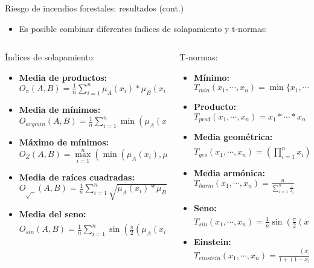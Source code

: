 \documentclass{beamer}
\begin{document}
\begin{frame}{Riesgo de incendios forestales: resultados (cont.)}
\begin{itemize}
\item Es posible combinar diferentes índices de solapamiento y t-normas:
\end{itemize}
\begin{columns}[T] %
\begin{column}{.48\textwidth}
Índices de solapamiento:
\footnotesize
\begin{itemize}
	\item \bfseries Media de productos: \\ $O_{\pi}(A,B) = \frac{1}{n}\sum_{i=1}^{n}\mu_A(x_i)*\mu_B(x_i)$
	\item \bfseries Media de mínimos: \\ $O_{avgmin}(A,B) = \frac{1}{n}\sum_{i=1}^{n}\min(\mu_A(x_i),\mu_B(x_i))$
	\item \bfseries Máximo de mínimos: \\ $O_{Z}(A,B) = \max\limits_{i=1}^{n}(\min(\mu_A(x_i),\mu_B(x_i)))$
	\item \bfseries Media de raíces cuadradas: \\ $O_{\sqrt{\text{ }}}(A,B) =  \frac{1}{n}\sum_{i=1}^{n}\sqrt{\mu_A(x_i)*\mu_B(x_i)}$
	\item \bfseries Media del seno:  \\ $O_{sin}(A, B) = \frac{1}{n}\sum_{i=1}^{n}\sin(\frac{\pi}{2}(\mu_A(x_i)*\mu_B(x_i)))^{\frac{1}{4}}$
\end{itemize}
\end{column}%
\hfill%
\begin{column}{.48\textwidth}
T-normas:
\footnotesize
\begin{itemize}
	\item \bfseries Mínimo: \\ $T_{min}(x_{1},\cdots,x_{n}) = \min\{x_{1},\cdots,x_{n}\}$
	\item \bfseries Producto:\\ $T_{prod}(x_{1},\cdots,x_{n}) = x_{1} * \cdots * x_{n}$
	\item \bfseries Media geométrica:\\ $T_{geo}(x_{1},\cdots,x_{n}) = (\prod\limits_{i=1}^{n}x_{i})^{\frac{1}{n}}$
	\item \bfseries Media armónica:\\ $T_{harm}(x_{1},\cdots,x_{n}) = \frac{n}{\sum_{i=1}^{n}\frac{1}{x_i}}$
	\item \bfseries Seno:\\ $T_{sin}(x_{1},\cdots,x_{n}) = \frac{1}{n}\sin(\frac{\pi}{2}(x_1 * \ldots * x_n))^{\frac{1}{4}}$
	\item \bfseries Einstein:\\ $T_{einstein}(x_{1},\cdots,x_{n}) = \frac{(x_{1} * \cdots * x_{n})}{1 + (1 - x_{1} )* \ldots * (1 - x_{n} )}$
\end{itemize}
\end{column}%
\end{columns}
\end{frame}
\end{document}
